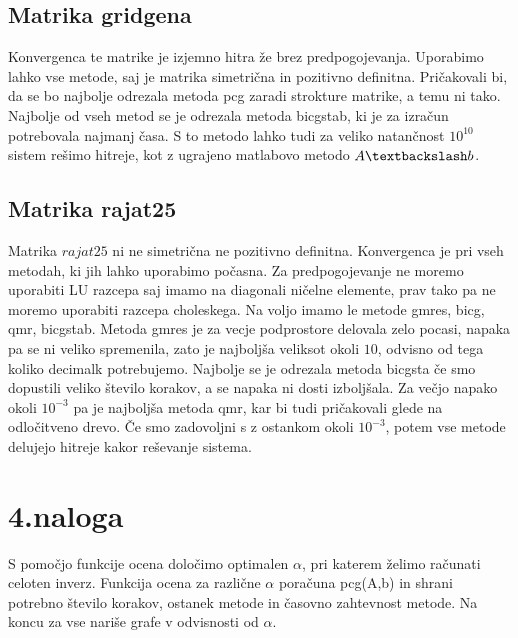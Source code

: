 \documentclass[11pt]{article} %
\begin{document}
\subsection{Matrika gridgena}

Konvergenca te matrike je izjemno hitra že brez predpogojevanja. Uporabimo lahko vse metode, saj je matrika simetrična in pozitivno definitna. Pričakovali bi, da se bo najbolje odrezala metoda pcg zaradi strokture matrike, a temu ni tako. Najbolje od vseh metod se je odrezala metoda bicgstab, ki je za izračun potrebovala najmanj časa. S to metodo lahko tudi za veliko natančnost $10^{10}$ sistem rešimo hitreje, kot z ugrajeno matlabovo metodo $A\textbackslash b$.

\subsection{Matrika rajat25}

Matrika $rajat25$ ni ne simetrična ne pozitivno definitna. Konvergenca je pri vseh metodah, ki jih lahko uporabimo počasna. Za predpogojevanje ne moremo uporabiti LU razcepa saj imamo na diagonali ničelne elemente, prav tako pa ne moremo uporabiti razcepa choleskega.  Na voljo imamo le metode gmres, bicg, qmr, bicgstab. Metoda gmres je za vecje podprostore delovala zelo pocasi, napaka pa se ni veliko spremenila, zato je najboljša veliksot okoli $10$, odvisno od tega koliko decimalk potrebujemo. Najbolje se je odrezala metoda bicgsta če smo dopustili veliko število korakov, a se napaka ni dosti izboljšala. Za večjo napako okoli $10^{-3}$ pa je najboljša metoda qmr, kar bi tudi pričakovali glede na odločitveno drevo. Če smo zadovoljni s z ostankom okoli $10^{-3}$, potem vse metode delujejo hitreje kakor reševanje sistema.

\section{4.naloga}

S pomočjo funkcije ocena določimo optimalen $\alpha$, pri katerem želimo računati celoten inverz. Funkcija ocena za različne $\alpha$  poračuna pcg(A,b) in shrani potrebno število korakov, ostanek metode in časovno zahtevnost metode. Na koncu za vse nariše grafe v odvisnosti od $\alpha$. 
\end{document}
